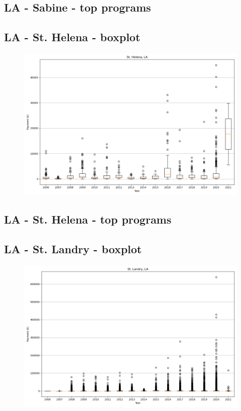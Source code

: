\subsection*{LA - Sabine - top programs}

\newpage
\subsection*{LA - St. Helena - boxplot}
\begin{figure}[h]
\centering
\includegraphics[width=7in]{../output/boxplots/counties/St. Helena-LA_boxplot.png}
\end{figure}


\subsection*{LA - St. Helena - top programs}

\newpage
\subsection*{LA - St. Landry - boxplot}
\begin{figure}[h]
\centering
\includegraphics[width=7in]{../output/boxplots/counties/St. Landry-LA_boxplot.png}
\end{figure}


